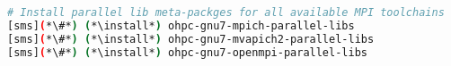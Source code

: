 
\begin{lstlisting}[language=bash,keywords={},upquote=true,keepspaces]
# Install parallel lib meta-packges for all available MPI toolchains
[sms](*\#*) (*\install*) ohpc-gnu7-mpich-parallel-libs
[sms](*\#*) (*\install*) ohpc-gnu7-mvapich2-parallel-libs
[sms](*\#*) (*\install*) ohpc-gnu7-openmpi-parallel-libs
\end{lstlisting}
